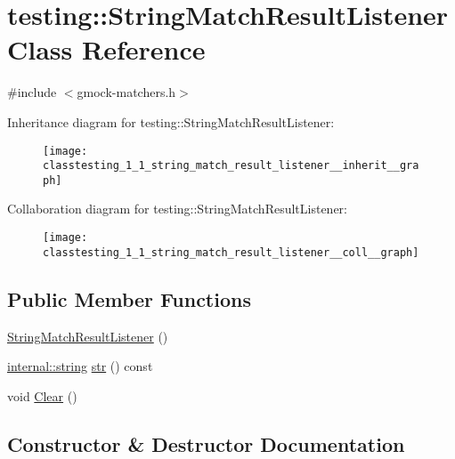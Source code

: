 \hypertarget{classtesting_1_1_string_match_result_listener}{}\section{testing\+:\+:String\+Match\+Result\+Listener Class Reference}
\label{classtesting_1_1_string_match_result_listener}


{\ttfamily \#include $<$gmock-\/matchers.\+h$>$}



Inheritance diagram for testing\+:\+:String\+Match\+Result\+Listener\+:
\nopagebreak
\begin{figure}[H]
\begin{center}
\leavevmode
\texttt{[image: classtesting\_1\_1\_string\_match\_result\_listener\_\_inherit\_\_graph]}
\end{center}
\end{figure}


Collaboration diagram for testing\+:\+:String\+Match\+Result\+Listener\+:
\nopagebreak
\begin{figure}[H]
\begin{center}
\leavevmode
\texttt{[image: classtesting\_1\_1\_string\_match\_result\_listener\_\_coll\_\_graph]}
\end{center}
\end{figure}
\subsection*{Public Member Functions}
\begin{DoxyCompactItemize}
\item 
\hyperlink{classtesting_1_1_string_match_result_listener_a3894c8adca960a2f20a3db6a02b09238}{String\+Match\+Result\+Listener} ()
\item 
\hyperlink{namespacetesting_1_1internal_a8e8ff5b11e64078831112677156cb111}{internal\+::string} \hyperlink{classtesting_1_1_string_match_result_listener_a601171722243ac405f40c3efbec6f982}{str} () const 
\item 
void \hyperlink{classtesting_1_1_string_match_result_listener_afd6e59e768516386a3908e7f5cc135d3}{Clear} ()
\end{DoxyCompactItemize}


\subsection{Constructor \& Destructor Documentation}
